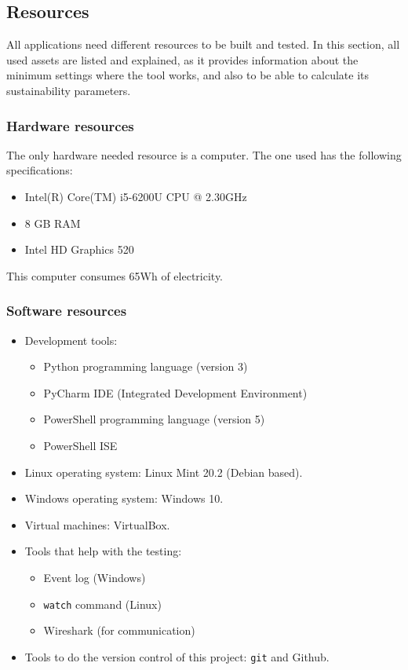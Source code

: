 \subsection{Resources}
\label{ssec:resources}
All applications need different resources to be built and tested. In this section, all used assets are listed and explained, as it provides information about the minimum settings where the tool works, and also to be able to calculate its sustainability parameters.

\subsubsection{Hardware resources}
The only hardware needed resource is a computer. The one used has the following specifications:
\begin{itemize}
\item Intel(R) Core(TM) i5-6200U CPU @ 2.30GHz
\item 8 GB RAM
\item Intel HD Graphics 520
\end{itemize} 
This computer consumes 65Wh of electricity.

\subsubsection{Software resources}
\begin{itemize}
\item Development tools: 
\begin{itemize}
\item Python programming language (version 3)
\item PyCharm IDE (Integrated Development Environment)
\item PowerShell programming language (version 5)
\item PowerShell ISE
\end{itemize}
\item Linux operating system: Linux Mint 20.2 (Debian based).
\item Windows operating system: Windows 10.
\item Virtual machines: VirtualBox.
\item Tools that help with the testing:
\begin{itemize}
\item Event log (Windows)
\item \texttt{watch} command (Linux) 
\item Wireshark (for communication)
\end{itemize}
\item Tools to do the version control of this project: \texttt{git} and Github.
\end{itemize}

